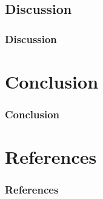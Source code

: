 \documentclass[11pt, aspectratio=1610, xcolor={dvipsnames}]{beamer}
\begin{document}
	\begin{frame}
		\frametitle{}
	\end{frame}
	
	\subsection{Discussion}
	\begin{frame}
		\frametitle{Discussion}
	\end{frame}
	
	\begin{frame}
		\frametitle{}
	\end{frame}
	
	\section{Conclusion}
	\begin{frame}
		\frametitle{Conclusion}
	\end{frame}
	
	\begin{frame}
		\frametitle{}
	\end{frame}
	
	\section*{References}
	\begin{frame}
		\frametitle{References}
	\end{frame}
	
	\begin{frame}
		\frametitle{}
	\end{frame}
	
\end{document}
